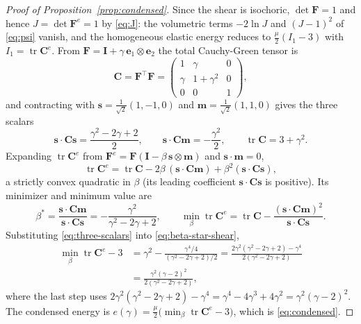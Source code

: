 \documentclass[10pt,a4paper]{amsart}
\newcommand{\Ce}{\bC^{e}}
\newcommand{\Fe}{\bF^{e}}
\newcommand{\bC}{\bm{C}}
\newcommand{\bF}{\bm{F}}
\newcommand{\bI}{\bm{I}}
\newcommand{\bmm}{\bm{m}}
\newcommand{\bs}{\bm{s}}
\newcommand{\tr}{\operatorname{tr}}
\begin{document}
\begin{proof}[Proof of Proposition~\textup{\ref{prop:condensed}}]
Since the shear is isochoric, $\det\bF=1$ and hence $J=\det\Fe=1$ by
\eqref{eq:J}: the volumetric terms $-2\ln J$ and $(J-1)^{2}$ of \eqref{eq:psi}
vanish, and the homogeneous elastic energy reduces to $\tfrac{\mu}{2}(I_1-3)$
with $I_1=\tr\Ce$. From $\bF=\bI+\gamma\,\bm{e}_1\otimes\bm{e}_2$ the total
Cauchy-Green tensor is
\begin{equation}\label{eq:C-shear}
  \bC=\bF^{\!\top}\bF=
  \begin{pmatrix}1&\gamma&0\\[2pt]\gamma&1+\gamma^{2}&0\\[2pt]0&0&1\end{pmatrix},
\end{equation}
and contracting with $\bs=\tfrac1{\sqrt2}(1,-1,0)$ and
$\bmm=\tfrac1{\sqrt2}(1,1,0)$ gives the three scalars
\begin{equation}\label{eq:three-scalars}
  \bs\cdot\bC\bs=\frac{\gamma^{2}-2\gamma+2}{2},\qquad
  \bs\cdot\bC\bmm=-\frac{\gamma^{2}}{2},\qquad
  \tr\bC=3+\gamma^{2}.
\end{equation}
Expanding $\tr\Ce$ from $\Fe=\bF(\bI-\beta\,\bs\otimes\bmm)$ and
$\bs\cdot\bmm=0$,
\begin{equation*}
  \tr\Ce=\tr\bC-2\beta\,(\bs\cdot\bC\bmm)+\beta^{2}(\bs\cdot\bC\bs),
\end{equation*}
a strictly convex quadratic in $\beta$ (its leading coefficient
$\bs\cdot\bC\bs$ is positive). Its minimizer and minimum value are
\begin{equation}\label{eq:beta-star-shear}
  \beta^{\ast}=\frac{\bs\cdot\bC\bmm}{\bs\cdot\bC\bs}
  =-\frac{\gamma^{2}}{\gamma^{2}-2\gamma+2},\qquad
  \min_{\beta}\tr\Ce=\tr\bC-\frac{(\bs\cdot\bC\bmm)^{2}}{\bs\cdot\bC\bs}.
\end{equation}
Substituting \eqref{eq:three-scalars} into \eqref{eq:beta-star-shear},
\begin{equation}\label{eq:trCe-min}
\begin{split}
  \min_{\beta}\tr\Ce-3
  &=\gamma^{2}-\frac{\gamma^{4}/4}{(\gamma^{2}-2\gamma+2)/2}
  =\frac{2\gamma^{2}(\gamma^{2}-2\gamma+2)-\gamma^{4}}{2(\gamma^{2}-2\gamma+2)}\\
  &=\frac{\gamma^{2}(\gamma-2)^{2}}{2(\gamma^{2}-2\gamma+2)},
\end{split}
\end{equation}
where the last step uses
$2\gamma^{2}(\gamma^{2}-2\gamma+2)-\gamma^{4}
=\gamma^{4}-4\gamma^{3}+4\gamma^{2}=\gamma^{2}(\gamma-2)^{2}$. The
condensed energy is $e(\gamma)=\tfrac{\mu}{2}\bigl(\min_{\beta}\tr\Ce-3\bigr)$,
which is \eqref{eq:condensed}. 
\end{proof}
\end{document}
